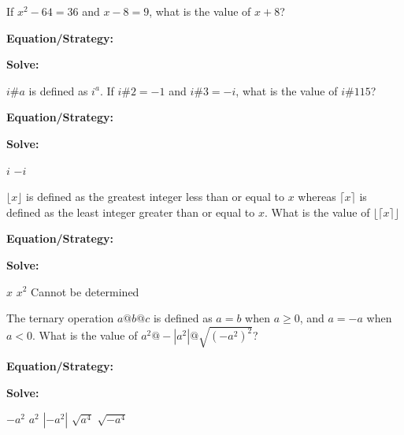 \vfill
\newpage
\begin{multicols*}{2}
\begin{outline}[enumerate]
\medium

\1 If $x^2-64=36$ and $x-8=9$, what is the value of $x+8$?

\bigskip
\textbf{Equation/Strategy:} \hrulefill

\bigskip
\textbf{Solve:}

\vfill
{}

\midline

\1 $i\#a$ is defined as $i^a$. If $i\#2=-1$ and $i\#3=-i$, what is the value of $i\#115$?

\bigskip
\textbf{Equation/Strategy:} \hrulefill

\bigskip
\textbf{Solve:}

\vfill
{}
\2 $i$
\2 $-i$

\columnbreak
\advanced

\1 $\lfloor x\rfloor$ is defined as the greatest integer less than or equal to $x$ whereas $\lceil x\rceil$ is defined as the least integer greater than or equal to $x$. What is the value of $\lfloor\lceil x\rceil\rfloor$

\bigskip
\textbf{Equation/Strategy:} \hrulefill

\bigskip
\textbf{Solve:}

\vfill
{}
\2 $x$
\2 $x^2$
\2 Cannot be determined

\midline

\1 The ternary operation $a@b@c$ is defined as $a=b$ when $a\geq0$, and $a=-a$ when $a<0$. What is the value of $a^2@-\left|a^2\right|@\sqrt{(-a^2)^2}$?

\bigskip
\textbf{Equation/Strategy:} \hrulefill

\bigskip
\textbf{Solve:}

\vfill
\2 $-a^2$
\2 $a^2$
\2 $\left|-a^2\right|$
\2 $\sqrt{a^4}$
\2 $\sqrt{-a^4}$
\end{outline}
\end{multicols*}